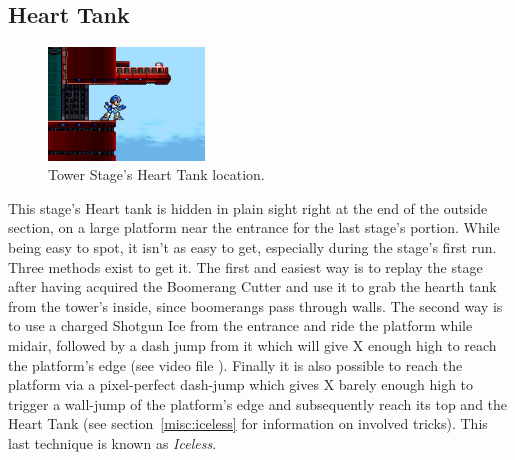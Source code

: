\subsection{Heart Tank}
\begin{figure}[htp]
	\centering
	\includegraphics[height=3cm]{figures/X1/Boomer_kuwanger/Tower_heart.jpg}
	\caption{Tower Stage's Heart Tank location.}
\end{figure}

This stage's Heart tank is hidden in plain sight right at the end of the outside section, on a large platform near the entrance for the last stage's portion. While being easy to spot, it isn't as easy to get, especially during the stage's first run. Three methods exist to get it. The first and easiest way is to replay the stage after having acquired the Boomerang Cutter and use it to grab the hearth tank from the tower's inside, since boomerangs pass through walls. The second way is to use a charged Shotgun Ice from the entrance and ride the platform while midair, followed by  a dash jump from it which will give X enough high to reach the platform's edge (see video file ). Finally it is also possible to reach the platform via a pixel-perfect dash-jump which gives X barely enough high to trigger a wall-jump of the platform's edge and subsequently reach its top and the Heart Tank (see section~\ref{misc:iceless} for information on involved tricks). This last technique is known as \textit{Iceless}. 

